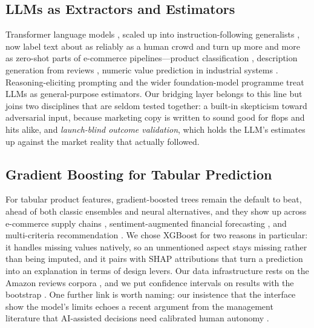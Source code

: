 \documentclass[journal]{IEEEtran}
\begin{document}
\subsection{LLMs as Extractors and Estimators}
Transformer language models \cite{vaswani2017attention,devlin2019bert}, scaled up into instruction-following generalists \cite{brown2020gpt3,ouyang2022instruct,openai2023gpt4,gemini2023,touvron2023llama}, now label text about as reliably as a human crowd \cite{gilardi2023chatgpt} and turn up more and more as zero-shot parts of e-commerce pipelines---product classification \cite{roumeliotis2025llms}, description generation from reviews \cite{gutierrez2025zeroshot}, numeric value prediction in industrial systems \cite{hidayat2025custody}. Reasoning-eliciting prompting \cite{wei2022chain} and the wider foundation-model programme \cite{bommasani2021foundation} treat LLMs as general-purpose estimators. Our bridging layer belongs to this line but joins two disciplines that are seldom tested together: a built-in skepticism toward adversarial input, because marketing copy is written to sound good for flops and hits alike, and \emph{launch-blind outcome validation}, which holds the LLM's estimates up against the market reality that actually followed.

\subsection{Gradient Boosting for Tabular Prediction}
For tabular product features, gradient-boosted trees \cite{friedman2001greedy,chen2016xgboost,ke2017lightgbm} remain the default to beat, ahead of both classic ensembles \cite{breiman2001random} and neural alternatives, and they show up across e-commerce supply chains \cite{sayyad2024catboost}, sentiment-augmented financial forecasting \cite{zhen2025stock,shang2025bitcoin}, and multi-criteria recommendation \cite{rakee2025temul}. We chose XGBoost for two reasons in particular: it handles missing values natively, so an unmentioned aspect stays missing rather than being imputed, and it pairs with SHAP attributions \cite{lundberg2017shap} that turn a prediction into an explanation in terms of design levers. Our data infrastructure rests on the Amazon reviews corpora \cite{he2016ups,hou2024amazon}, and we put confidence intervals on results with the bootstrap \cite{efron1979bootstrap}. One further link is worth naming: our insistence that the interface show the model's limits echoes a recent argument from the management literature that AI-assisted decisions need calibrated human autonomy \cite{cristofaro2026dancing}.
\end{document}
